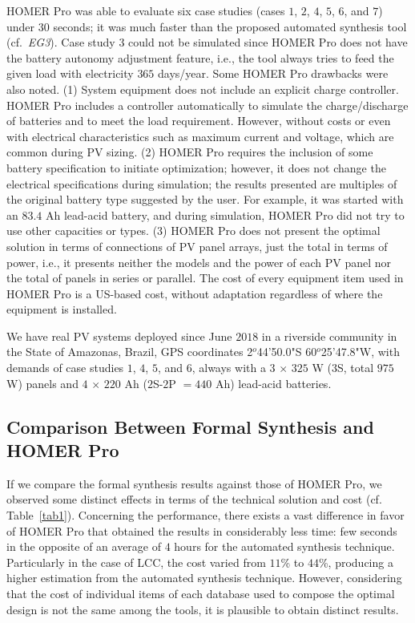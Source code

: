 \documentclass[10pt,journal,compsoc]{IEEEtran}
\begin{document}
HOMER Pro was able to evaluate six case studies (cases $1$, $2$, $4$, $5$, $6$, and $7$) under $30$ seconds; it was much faster than the proposed automated synthesis tool (cf.~\textit{EG3}). Case study $3$ could not be simulated since HOMER Pro does not have the battery autonomy adjustment feature, i.e., the tool always tries to feed the given load with electricity $365$ days/year. Some HOMER Pro drawbacks were also noted. (1) System equipment does not include an explicit charge controller. HOMER Pro includes a controller automatically to simulate the charge/discharge of batteries and to meet the load requirement. However, without costs or even with electrical characteristics such as maximum current and voltage, which are common during PV sizing. (2) HOMER Pro requires the inclusion of some battery specification to initiate optimization; however, it does not change the electrical specifications during simulation; the results presented are multiples of the original battery type suggested by the user. For example, it was started with an $83.4$ Ah lead-acid battery, and during simulation, HOMER Pro did not try to use other capacities or types. (3) HOMER Pro does not present the optimal solution in terms of connections of PV panel arrays, just the total in terms of power, i.e., it presents neither the models and the power of each PV panel nor the total of panels in series or parallel. The cost of every equipment item used in HOMER Pro is a US-based cost, without adaptation regardless of where the equipment is installed.

We have real PV systems deployed since June $2018$ in a riverside community in the State of Amazonas, Brazil, GPS coordinates 2$^{o}$44'50.0"S 60$^{o}$25'47.8"W, with demands of case studies $1$, $4$, $5$, and $6$, always with a $3$ $\times$ $325$ W ($3$S, total $975$ W) panels and $4$ $\times$ $220$ Ah ($2$S-$2$P $= 440$ Ah) lead-acid batteries.

\subsection{Comparison Between Formal Synthesis and HOMER Pro}

If we compare the formal synthesis results against those of HOMER Pro, we observed some distinct effects in terms of the technical solution and cost (cf. Table~\ref{tab1}). Concerning the performance, there exists a vast difference in favor of HOMER Pro that obtained the results in considerably less time: few seconds in the opposite of an average of $4$ hours for the automated synthesis technique. Particularly in the case of LCC, the cost varied from $11$\% to $44$\%, producing a higher estimation from the automated synthesis technique. However, considering that the cost of individual items of each database used to compose the optimal design is not the same among the tools, it is plausible to obtain distinct results.
\end{document}
